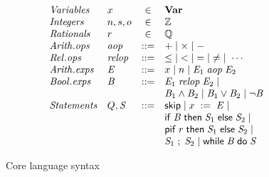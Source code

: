 \documentclass[10pt]{sigplanconf}
\begin{document}
\begin{figure}[t]
\[ \begin{array}{llcl}
\mathit{Variables} & x & \in & \vars \\
\mathit{Integers} & n,s,o & \in & \Integer \\
\mathit{Rationals} & r & \in & \Rational \\
\mathit{Arith. ops} & \arithop &::= & + \mid \times \mid - \\
\mathit{Rel. ops} & \relop &::= & \leq \;\mid\; < \;\mid\; = \;\mid\; \neq \;\mid\; \cdots
\\
\mathit{Arith. exps} & \aexp &::= & x \mid n \mid \aop{\aexp_1}{\aexp_2} \\
\mathit{Bool. exps} & \bexp &::= & \bop{\aexp_1}{\aexp_2} \mid \\
& && \bexp_1 \wedge \bexp_2 \mid \bexp_1 \vee \bexp_2 \mid \aneg{\bexp} \\
\mathit{Statements} & Q,\stmt &::= & \sskip \mid \sassign{x}{\aexp} \mid \\
&     && \sif{\bexp}{\stmt_1}{\stmt_2} \mid \\
&     && \spif{r}{\stmt_1}{\stmt_2} \mid \\
&     && \sseq{\stmt_1}{\stmt_2} \mid \swhile{\bexp}{\stmt} %
\end{array} \]
\vspace*{-0.1in}
\caption{Core language syntax} \label{fig:syntax}
\vspace*{-0.1in}
\end{figure}
\end{document}
